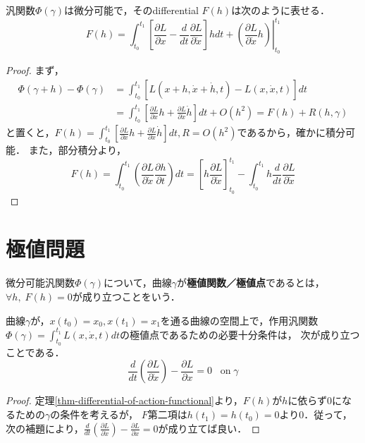 \documentclass[uplatex,dvipdfmx]{jsreport}
\begin{document}
\begin{theorem}\label{thm-differential-of-action-functional}
    汎関数$\Phi(\gamma)$は微分可能で，そのdifferential $F(h)$は次のように表せる．
    \[ F(h) = \int^{t_1}_{t_0}\left.\left[ \frac{\partial L}{\partial x}-\frac{d}{dt}\frac{\partial L}{\partial\dot{x}} \right]hdt+\left(\frac{\partial L}{\partial\dot{x}}h\right) \right|^{t_1}_{t_0} \]
\end{theorem}
\begin{proof}
    まず，
    \begin{align*}
        \Phi(\gamma+h)-\Phi(\gamma) &= \int^{t_1}_{t_0}\left[L(x+h,\dot{x}+\dot{h},t)-L(x,\dot{x},t)\right]dt\\
        &= \int^{t_1}_{t_0}\left[\frac{\partial L}{\partial x}h+\frac{\partial L}{\partial\dot{x}}\dot{h}\right]dt + O(h^2) = F(h) + R(h,\gamma)
    \end{align*}
    と置くと，$F(h)=\int^{t_1}_{t_0}\left[\frac{\partial L}{\partial x}h+\frac{\partial L}{\partial\dot{x}}\dot{h}\right]dt, R=O(h^2)$であるから，確かに積分可能．
    また，部分積分より，
    \[ F(h) = \int^{t_1}_{t_0}\left( \frac{\partial L}{\partial\dot{x}}\frac{\partial h}{\partial t} \right)dt = \left[ h\frac{\partial L}{\partial\dot{x}} \right]^{t_1}_{t_0} - \int^{t_1}_{t_0} h\frac{d}{dt}\frac{\partial L}{\partial\dot{x}} \]
\end{proof}

\section{極値問題}

\begin{definition}[extremal]
    微分可能汎関数$\Phi(\gamma)$について，曲線$\gamma$が\textbf{極値関数／極値点}であるとは，$\forall h,\; F(h)=0$が成り立つことをいう．
\end{definition}

\begin{theorem}\label{thm-EL-equation}
    曲線$\gamma$が，$x(t_0)=x_0,x(t_1)=x_1$を通る曲線の空間上で，作用汎関数$\Phi(\gamma)=\int^{t_1}_{t_0}L(x,\dot{x},t)dt$の極値点であるための必要十分条件は，
    次が成り立つことである．
    \[ \frac{d}{dt}\left(\frac{\partial L}{\partial\dot{x}}\right) - \frac{\partial L}{\partial x} = 0\;\;\;\mathrm{on\;}\gamma \]
\end{theorem}
\begin{proof}
    定理\ref{thm-differential-of-action-functional}より，$F(h)$が$h$に依らず$0$になるための$\gamma$の条件を考えるが，
    $F$第二項は$h(t_1)=h(t_0)=0$より$0$．従って，次の補題により，$\frac{d}{dt}\left(\frac{\partial L}{\partial\dot{x}}\right) - \frac{\partial L}{\partial x} = 0$が成り立てば良い．
\end{proof}
\end{document}

